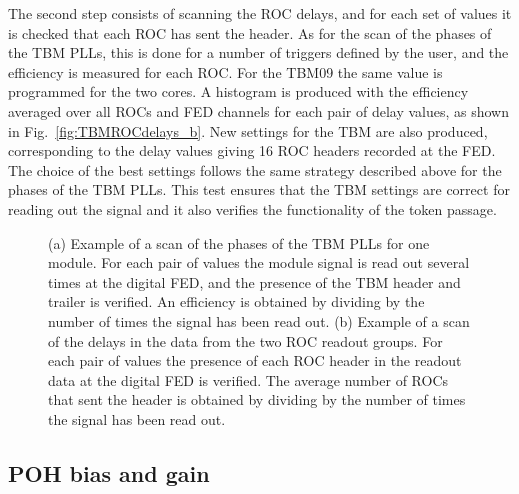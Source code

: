 The second step consists of scanning the ROC delays, and for each set of values it is checked that each ROC has sent the header.
As for the scan of the phases of the TBM PLLs, this is done for a number of triggers defined by the user, and the efficiency is measured for each ROC.
For the TBM09 the same value is programmed for the two cores.
A histogram is produced with the efficiency averaged over all ROCs and FED channels for each pair of delay values, as shown in Fig.~\ref{fig:TBMROCdelays_b}.
New settings for the TBM are also produced, corresponding to the delay values giving 16 ROC headers recorded at the FED.
The choice of the best settings follows the same strategy described above for the phases of the TBM PLLs.
This test ensures that the TBM settings are correct for reading out the signal and it also verifies the functionality of the token passage.

\begin{figure}[!htb]
 \begin{center}
 \end{center}
 \caption{(a) Example of a scan of the phases of the TBM PLLs for one module. For each pair of values the module signal is read out several times at the digital FED, and the presence of the TBM header and trailer is verified.
 An efficiency is obtained by dividing by the number of times the signal has been read out.
 (b) Example of a scan of the delays in the data from the two ROC readout groups. For each pair of values the presence of each ROC header in the readout data at the digital FED is verified. The average number of ROCs that sent the header is obtained by dividing by the number of times the signal has been read out.}
 \label{fig:TBMROCdelays}
\end{figure} 

\subsection{POH bias and gain}

